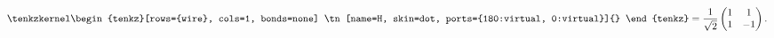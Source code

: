 \[
  \tenkzkernel
  \begin{tenkz}[rows={wire}, cols=1, bonds=none]
    \tn[name=H, skin=dot, ports={180:virtual, 0:virtual}]{}
  \end{tenkz}
  =\frac{1}{\sqrt2}\begin{pmatrix}1&1\\1&-1\end{pmatrix}.
\]
